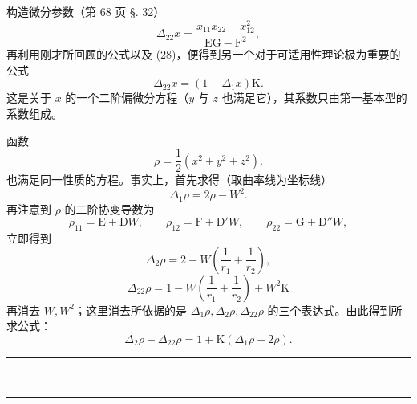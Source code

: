 构造微分参数（第 68 页 §. 32）
\[
\Delta_{22}x=\frac{x_{11}x_{22}-x_{12}^2}{\mathrm{E}\mathrm{G}-\mathrm{F}^2},
\]
再利用刚才所回顾的公式以及 (28)，便得到另一个对于可适用性理论极为重要的公式
\begin{equation}\tag{B}
\Delta_{22}x=(1-\Delta_1x)\mathrm{K}.
\end{equation}
这是关于 \(x\) 的一个二阶偏微分方程（\(y\) 与 \(z\) 也满足它），其系数只由第一基本型的系数组成。

函数
\[
\rho=\frac12(x^2+y^2+z^2).
\]
也满足同一性质的方程。事实上，首先求得（取曲率线为坐标线）
\[
\Delta_1\rho=2\rho-W^2.
\]
再注意到 \(\rho\) 的二阶协变导数为
\[
\rho_{11}=\mathrm{E}+\mathrm{D}W, \qquad \rho_{12}=\mathrm{F}+\mathrm{D'}W, \qquad \rho_{22}=\mathrm{G}+\mathrm{D''}W,
\]
立即得到
\[
\Delta_2\rho=2-W\left(\frac1{r_1}+\frac1{r_2}\right),
\]
\[
\Delta_{22}\rho=1-W\left(\frac1{r_1}+\frac1{r_2}\right)+W^2\mathrm{K}
\]
再消去 \(W,W^2\)；这里消去所依据的是 \(\Delta_1\rho,\Delta_2\rho,\Delta_{22}\rho\) 的三个表达式。由此得到所求公式：
\begin{equation}\tag{C}
\Delta_2\rho-\Delta_{22}\rho=1+\mathrm{K}(\Delta_1\rho-2\rho).
\end{equation}

\begin{center}
\rule{2.5em}{0.4pt}\,\textbullet\textbullet\textbullet\,\rule{2.5em}{0.4pt}\\[-0.25em]
\textbullet
\end{center}
